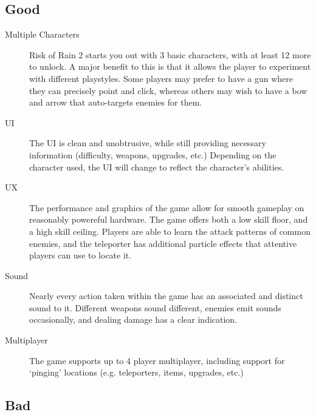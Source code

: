 \documentclass{article}
\begin{document}
\subsection{Good}
\begin{description}
      \item[Multiple Characters] Risk of Rain 2 starts you out with 3 basic
            characters, with at least 12 more to unlock. A major benefit to this is
            that it allows the player to experiment with different playstyles. Some
            players may prefer to have a gun where they can precisely point and click, whereas others may wish
            to have a bow and arrow that auto-targets enemies for them.
      \item[UI] The UI is clean and unobtrusive, while still providing necessary
            information (difficulty, weapons, upgrades, etc.) Depending on the
            character used, the UI will change to reflect the character's abilities.
      \item[UX] The performance and graphics of the game allow for smooth gameplay
            on reasonably powereful hardware. The game offers both a low skill
            floor, and a high skill ceiling. Players are able to learn the attack
            patterns of common enemies, and the teleporter has additional particle
            effects that attentive players can use to locate it.
      \item[Sound] Nearly every action taken within the game has an associated
            and distinct sound to it. Different weapons sound different, enemies
            emit sounds occasionally, and dealing damage has a clear indication.
      \item[Multiplayer] The game supports up to 4 player multiplayer,
            including support for `pinging' locations (e.g. teleporters, items,
            upgrades, etc.)
\end{description}
\subsection{Bad}
\end{document}
